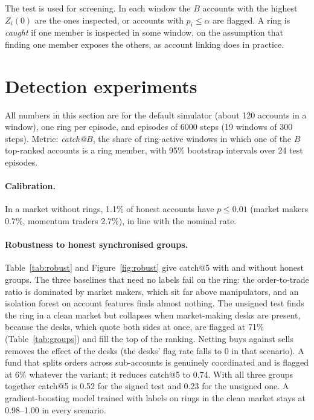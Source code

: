 \documentclass[11pt,a4paper]{article}
\begin{document}
The test is used for screening. In each window the $B$ accounts with the highest $Z_i(0)$ are the ones inspected, or accounts with $p_i\le\alpha$ are flagged. A ring is \emph{caught} if one member is inspected in some window, on the assumption that finding one member exposes the others, as account linking does in practice.

\section{Detection experiments}\label{sec:detect}

All numbers in this section are for the default simulator (about 120 accounts in a window), one ring per episode, and episodes of 6000 steps (19 windows of 300 steps). Metric: \emph{catch@$B$}, the share of ring-active windows in which one of the $B$ top-ranked accounts is a ring member, with 95\% bootstrap intervals over 24 test episodes.

\paragraph{Calibration.} In a market without rings, 1.1\% of honest accounts have $p\le 0.01$ (market makers 0.7\%, momentum traders 2.7\%), in line with the nominal rate.

\paragraph{Robustness to honest synchronised groups.} Table~\ref{tab:robust} and Figure~\ref{fig:robust} give catch@5 with and without honest groups. The three baselines that need no labels fail on the ring: the order-to-trade ratio is dominated by market makers, which sit far above manipulators, and an isolation forest on account features finds almost nothing. The unsigned test finds the ring in a clean market but collapses when market-making desks are present, because the desks, which quote both sides at once, are flagged at 71\% (Table~\ref{tab:groups}) and fill the top of the ranking. Netting buys against sells removes the effect of the desks (the desks' flag rate falls to 0 in that scenario). A fund that splits orders across sub-accounts is genuinely coordinated and is flagged at 6\% whatever the variant; it reduces catch@5 to 0.74. With all three groups together catch@5 is 0.52 for the signed test and 0.23 for the unsigned one. A gradient-boosting model trained with labels on rings in the clean market stays at 0.98--1.00 in every scenario.
\end{document}
